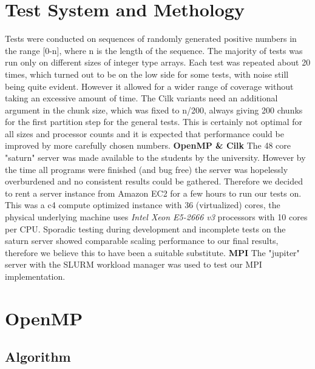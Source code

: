 \documentclass[12pt,a4paper]{article}
\begin{document}
\section{Test System and Methology}
Tests were conducted on sequences of randomly generated positive numbers in the range [0-n], where n is the length of the sequence. The majority of tests was run only on different sizes of integer type arrays. Each test was repeated about 20 times, which turned out to be on the low side for some tests, with noise still being quite evident. However it allowed for a wider range of coverage without taking an excessive amount of time. The Cilk variants need an additional argument in the chunk size, which was fixed to n/200, always giving 200 chunks for the first partition step for the general tests. This is certainly not optimal for all sizes and processor counts and it is expected that performance could be improved by more carefully chosen numbers.\newline\newline
\textbf{OpenMP \& Cilk}\newline
The 48 core "saturn" server was made available to the students by the university. However by the time all programs were finished (and bug free) the server was hopelessly overburdened and no consistent results could be gathered. Therefore we decided to rent a server instance from Amazon EC2 for a few hours to run our tests on. This was a c4 compute optimized instance with 36 (virtualized) cores, the physical underlying machine uses \emph{Intel Xeon E5-2666 v3} processors with 10 cores per CPU. Sporadic testing during development and incomplete tests on the saturn server showed comparable scaling performance to our final results, therefore we believe this to have been a suitable substitute.
\newline\newline
\textbf{MPI}\newline
The "jupiter" server with the SLURM workload manager was used to test our MPI implementation. 

\section{OpenMP}

\subsection{Algorithm}
\end{document}
